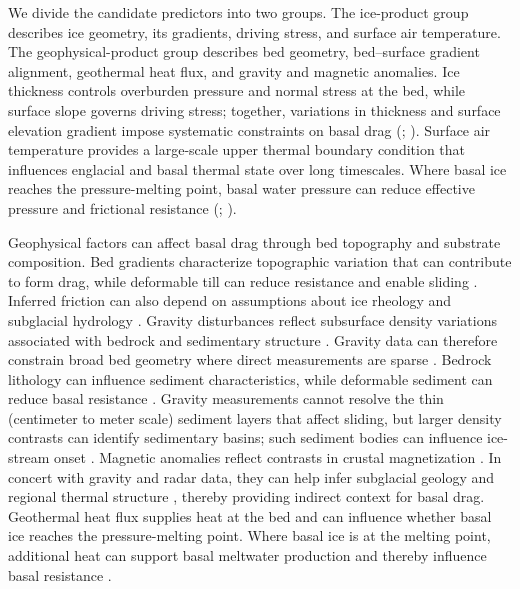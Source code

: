 \documentclass[review,jog]{igs}
\begin{document}
We divide the candidate predictors into two groups. The ice-product group describes ice geometry, its gradients, driving stress, and surface air temperature. The geophysical-product group describes bed geometry, bed--surface gradient alignment, geothermal heat flux, and gravity and magnetic anomalies. Ice thickness controls overburden pressure and normal stress at the bed, while surface slope governs driving stress; together, variations in thickness and surface elevation gradient impose systematic constraints on basal drag (\citealp{macayeal1989large}; \citealp[Sections 7.2--7.4 and 8.2]{cuffey2010physics}). Surface air temperature provides a large-scale upper thermal boundary condition that influences englacial and basal thermal state over long timescales. Where basal ice reaches the pressure-melting point, basal water pressure can reduce effective pressure and frictional resistance (\citealp[Chapters~6--7]{cuffey2010physics}; \citealp{iken1981effect,dawson2022ice}).

Geophysical factors can affect basal drag through bed topography and substrate composition. Bed gradients characterize topographic variation that can contribute to form drag, while deformable till can reduce resistance and enable sliding \citep{cuffey2010physics,tulaczyk2000basal,boulton2001sediment,hoffman2022impact}. Inferred friction can also depend on assumptions about ice rheology and subglacial hydrology \citep{rathmann2022inferred,mcarthur2023basal}.
Gravity disturbances reflect subsurface density variations associated with bedrock and sedimentary structure \citep{hackney2003geodetic}. Gravity data can therefore constrain broad bed geometry where direct measurements are sparse \citep{boghosian2015resolving,kennedy2020gravity}. Bedrock lithology can influence sediment characteristics, while deformable sediment can reduce basal resistance \citep{crompton2016correlations,boulton2001sediment}. Gravity measurements cannot resolve the thin (centimeter to meter scale) sediment layers that affect sliding, but larger density contrasts can identify sedimentary basins; such sediment bodies can influence ice-stream onset \citep{kennedy2020gravity,peters2006subglacial}. Magnetic anomalies reflect contrasts in crustal magnetization \citep{golynsky2018new}. In concert with gravity and radar data, they can help infer subglacial geology \citep{jordan2023geological} and regional thermal structure \citep{martos2017heat,reading2022antarctic}, thereby providing indirect context for basal drag. Geothermal heat flux supplies heat at the bed and can influence whether basal ice reaches the pressure-melting point. Where basal ice is at the melting point, additional heat can support basal meltwater production and thereby influence basal resistance \citep{dawson2022ice,kang2021evaluation}.
\end{document}
